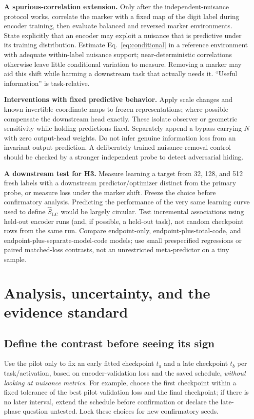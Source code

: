 \documentclass[11pt,a4paper]{article}
\begin{document}
\textbf{A spurious-correlation extension.} Only after the independent-nuisance protocol works, correlate the marker with a fixed map of the digit label during encoder training, then evaluate balanced and reversed marker environments. State explicitly that an encoder may exploit a nuisance that is predictive under its training distribution. Estimate Eq.~\eqref{eq:conditional} in a reference environment with adequate within-label nuisance support; near-deterministic correlations otherwise leave little conditional variation to measure. Removing a marker may aid this shift while harming a downstream task that actually needs it. ``Useful information'' is task-relative.

\textbf{Interventions with fixed predictive behavior.} Apply scale changes and known invertible coordinate maps to frozen representations; where possible compensate the downstream head exactly. These isolate observer or geometric sensitivity while holding predictions fixed. Separately append a bypass carrying $N$ with zero output-head weights. Do not infer genuine information loss from an invariant output prediction. A deliberately trained nuisance-removal control should be checked by a stronger independent probe to detect adversarial hiding.

\textbf{A downstream test for H3.} Measure learning a target from 32, 128, and 512 fresh labels with a downstream predictor/optimizer distinct from the primary probe, or measure loss under the marker shift. Freeze the choice before confirmatory analysis. Predicting the performance of the very same learning curve used to define $\widehat S_{\mathrm{LC}}$ would be largely circular. Test incremental associations using held-out encoder runs (and, if possible, a held-out task), not random checkpoint rows from the same run. Compare endpoint-only, endpoint-plus-total-code, and endpoint-plus-separate-model-code models; use small prespecified regressions or paired matched-loss contrasts, not an unrestricted meta-predictor on a tiny sample.

\section{Analysis, uncertainty, and the evidence standard}

\subsection{Define the contrast before seeing its sign}
Use the pilot only to fix an early fitted checkpoint $t_a$ and a late checkpoint $t_b$ per task/activation, based on encoder-validation loss and the saved schedule, \emph{without looking at nuisance metrics}. For example, choose the first checkpoint within a fixed tolerance of the best pilot validation loss and the final checkpoint; if there is no later interval, extend the schedule before confirmation or declare the late-phase question untested. Lock these choices for new confirmatory seeds.
\end{document}
